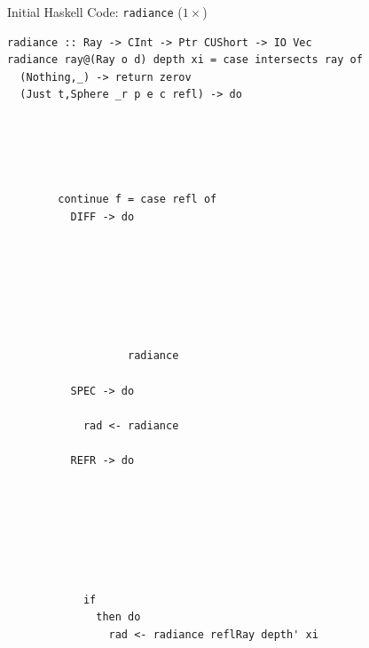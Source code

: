 \documentclass[8pt]{beamer}
\newcommand{\raw}[1]{\texttt{#1}}
\begin{document}
\begin{frame}[fragile]{Initial Haskell Code: \texttt{radiance} ($1\times$)}
\begin{verbatim}
radiance :: Ray -> CInt -> Ptr CUShort -> IO Vec
radiance ray@(Ray o d) depth xi = case intersects ray of
  (Nothing,_) -> return zerov
  (Just t,Sphere _r p e c refl) -> do
                                        
                                   
                                                              
                         
                                
        continue f = case refl of
          DIFF -> do
                                                
                               
                                
                                      
                                                                                           
                                  
                                                                                                                
                   radiance 
                                            
          SPEC -> do
                                                         
            rad <- radiance 
                                            
          REFR -> do
                                                                                                     
                                                                                   
                         
                           
                                                      
                                
                                                
            if 
              then do
                rad <- radiance reflRay depth' xi
\end{verbatim}

\end{frame}

\end{document}
